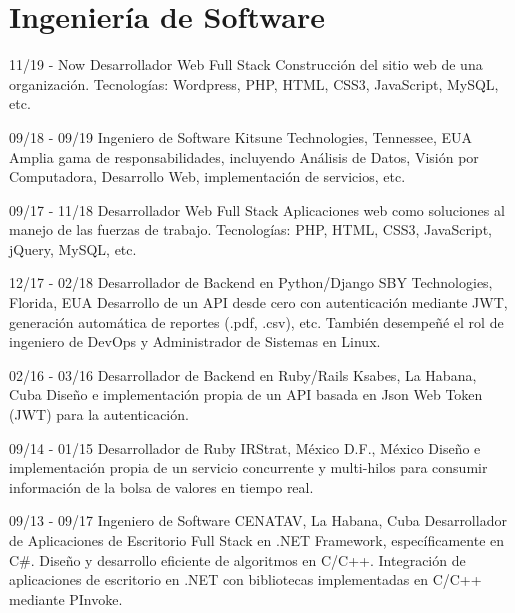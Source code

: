 \documentclass[]{friggeri-cv}
\begin{document}
\section{Ingeniería de Software}
\begin{entrylist}
  \entry
    {11/19 - Now}
    {Desarrollador Web Full Stack}
    {}
    {Construcción del sitio web de una organización. Tecnologías: Wordpress, PHP, HTML, CSS3, JavaScript, MySQL, etc.\\}

  \entry
    {09/18 - 09/19}
    {Ingeniero de Software}
    {Kitsune Technologies, Tennessee, EUA}   
    {Amplia gama de responsabilidades, incluyendo Análisis de Datos, Visión por Computadora, Desarrollo Web, implementación de servicios, etc.\\}

  \entry
    {09/17 - 11/18}
    {Desarrollador Web Full Stack}
    {}
    {Aplicaciones web como soluciones al manejo de las fuerzas de trabajo. Tecnologías: PHP, HTML, CSS3, JavaScript, jQuery, MySQL, etc.\\}
    
  \entry
    {12/17 - 02/18}
    {Desarrollador de Backend en Python/Django}
    {SBY Technologies, Florida, EUA}
    {Desarrollo de un API desde cero con autenticación mediante JWT, generación automática de reportes (.pdf, .csv), etc. También desempeñé el rol de ingeniero de DevOps y Administrador de Sistemas en Linux.\\}
    
  \entry
    {02/16 - 03/16}
    {Desarrollador de Backend en Ruby/Rails}
    {Ksabes, La Habana, Cuba}
    {Diseño e implementación propia de un API basada en Json Web Token (JWT) para la autenticación.\\}

  \entry
    {09/14 - 01/15}
    {Desarrollador de Ruby}
    {IRStrat, México D.F., México}
    {Diseño e implementación propia de un servicio concurrente y multi-hilos para consumir información de la bolsa de valores en tiempo real.\\}

  \entry
    {09/13 - 09/17}
    {Ingeniero de Software}
    {CENATAV, La Habana, Cuba}
    {Desarrollador de Aplicaciones de Escritorio Full Stack en .NET Framework, específicamente en C\#. Diseño y desarrollo eficiente de algoritmos en C/C++. Integración de aplicaciones de escritorio en .NET con bibliotecas implementadas en C/C++ mediante PInvoke.\\}    
    
\end{entrylist}
\end{document}
